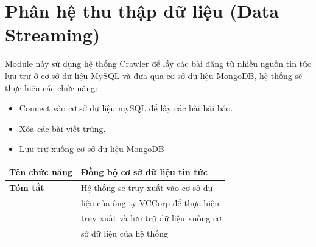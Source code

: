 \section{Phân hệ thu thập dữ liệu (Data Streaming)} \label{sec:DataStreaming}
Module này sử dụng hệ thống Crawler để lấy các bài đăng từ nhiều nguồn tin tức lưu trữ ở cơ sở dữ liệu MySQL và đưa qua cơ sở dữ liệu MongoDB, hệ thống sẽ thực hiện các chức năng:
	\begin{itemize}
		\item Connect vào cơ sở dữ liệu mySQL để lấy các bài bài báo.
		\item Xóa các bài viết trùng.
		\item Lưu trữ xuống cơ sở dữ liệu MongoDB
	\end{itemize}
  \begin{table}[H]
    \centering
    \setlength{\tabcolsep}{12pt}
    \begin{tabular}{ll} \toprule%
      \textbf{Tên chức năng}  &  Đồng bộ cơ sở dữ liệu tin tức \\ \toprule%
      \textbf{Tóm tắt}   &  Hệ thống sẽ truy xuất vào cơ sở dữ \\
                 & liệu của ông ty VCCorp để thực hiện \\ 
                 & truy xuất và lưu trữ dữ liệu xuống cơ \\
                 & sở dữ liệu của hệ thống \\ \midrule


\end{tabular}
\end{table}
